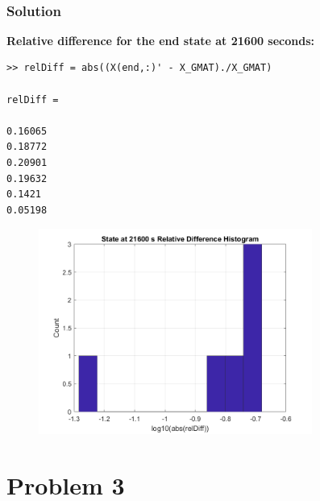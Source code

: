 \documentclass[conf]{new-aiaa}
\begin{document}
\begin{center}
	 \\
\end{center}

\subsubsection*{Solution} 

\textbf{Relative difference for the end state at 21600 seconds:}
\begin{lstlisting}
>> relDiff = abs((X(end,:)' - X_GMAT)./X_GMAT)

relDiff =

0.16065
0.18772
0.20901
0.19632
0.1421
0.05198
\end{lstlisting}

\begin{figure}
\centering 
\includegraphics[width=0.8\textwidth]{prob2_state_hist.png}
\end{figure}


\section*{Problem 3}
\end{document}
